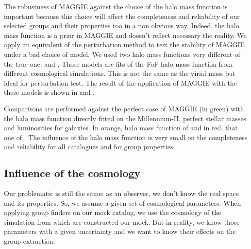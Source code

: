 The robustness of MAGGIE against the choice of the halo mass function is
important because this choice will affect the completeness and reliability of
our selected groups and their properties too in a non obvious way. Indeed, the
halo mass function is a prior in MAGGIE and doesn't reflect necessary the
reality. We apply an equivalent of the perturbation method to test the
stability of MAGGIE under a bad choice of model. We used two halo mass
functions very different of the true one: \citet{Warren+06} and
\citet{Courtin+11}. Those models are fits of the FoF halo mass function from
different cosmological simulations. This is not the same as the virial mass but
ideal for perturbation test. The result of the application of MAGGIE with the
these models is shown in  and
.

Comparisons are performed against the perfect case of MAGGIE (in green) with
the halo mass function directly fitted on the Millennium-II, perfect stellar
masses and luminosities for galaxies. In orange, halo mass function of
\citet{Warren+06} and in red, that one of \citet{Courtin+11}. The influence of
the halo mass function is very small on the completeness and reliability for
all catalogues and for group properties.

\subsection{Influence of the cosmology}

Our problematic is still the same: as an observer, we don't know the real space
and its properties. So, we assume a given set of cosmological parameters. When
applying group finders on our mock catalog, we use the cosmology of the
simulation from which are constructed our mock. But in reality, we know those
parameters with a given uncertainty and we want to know their effects on the
group extraction.

